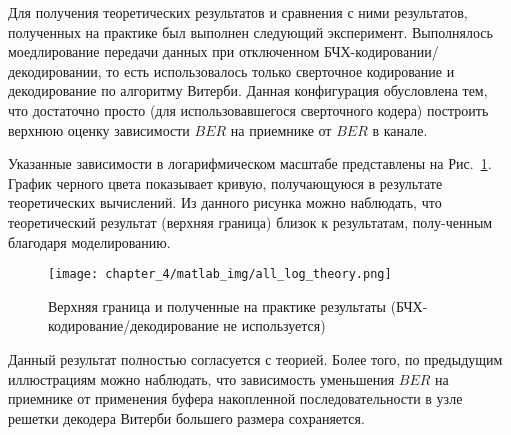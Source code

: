 Для получения теоретических результатов и сравнения с ними результатов, полученных на практике был выполнен следующий
эксперимент. Выполнялось моедлирование передачи данных при отключенном БЧХ-кодировании/декодировании, то есть использовалось
только сверточное кодирование и декодирование по алгоритму Витерби. Данная конфигурация обусловлена тем, что достаточно
просто (для использовавшегося сверточного кодера) построить верхнюю оценку зависимости $BER$ на приемнике от $BER$ в канале.

Указанные зависимости в логарифмическом масштабе представлены на Рис.~\ref{img_12}. График черного цвета показывает кривую,
получающуюся в результате теоретических вычислений. Из данного рисунка можно наблюдать, что теоретический результат
(верхняя граница) близок к результатам, полу-ченным благодаря моделированию.
\begin{figure}[h]
\begin{center}
\texttt{[image: chapter\_4/matlab\_img/all\_log\_theory.png]}
\caption{Верхняя граница и полученные на практике результаты (БЧХ-кодирование/декодирование не используется)}
\label{img_12}
\end{center}
\end{figure}

Данный результат полностью согласуется с теорией. Более того, по предыдущим иллюстрациям можно наблюдать, что
зависимость уменьшения $BER$ на приемнике от применения буфера накопленной последовательности в узле решетки
декодера Витерби большего размера сохраняется.